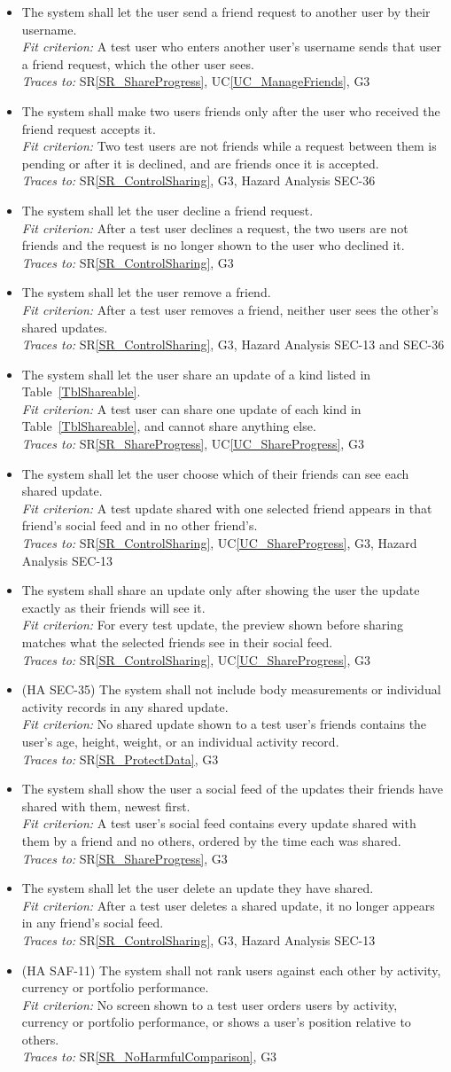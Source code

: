 \documentclass[12pt]{article}
\newcommand{\srref}[1]{SR\ref{#1}}
\newcommand{\ucref}[1]{UC\ref{#1}}
\newcounter{reqnum} %
\newcommand{\freq}[4]{%
  \item[FR\refstepcounter{reqnum}\thereqnum \label{#1}:] #2\\
  \textit{Fit criterion:} #3\\
  \textit{Traces to:} #4}
\begin{document}
\noindent \begin{itemize}
\freq{FR_SocialRequest}
  {The system shall let the user send a friend request to another user by
  their username.}
  {A test user who enters another user's username sends that user a friend
  request, which the other user sees.}
  {\srref{SR_ShareProgress}, \ucref{UC_ManageFriends}, G3}
\freq{FR_SocialAccept}
  {The system shall make two users friends only after the user who received
  the friend request accepts it.}
  {Two test users are not friends while a request between them is pending or
  after it is declined, and are friends once it is accepted.}
  {\srref{SR_ControlSharing}, G3, Hazard Analysis SEC-36}
\freq{FR_SocialDecline}
  {The system shall let the user decline a friend request.}
  {After a test user declines a request, the two users are not friends and the
  request is no longer shown to the user who declined it.}
  {\srref{SR_ControlSharing}, G3}
\freq{FR_SocialRemove}
  {The system shall let the user remove a friend.}
  {After a test user removes a friend, neither user sees the other's shared
  updates.}
  {\srref{SR_ControlSharing}, G3, Hazard Analysis SEC-13 and SEC-36}
\freq{FR_SocialShare}
  {The system shall let the user share an update of a kind listed in
  Table~\ref{TblShareable}.}
  {A test user can share one update of each kind in Table~\ref{TblShareable},
  and cannot share anything else.}
  {\srref{SR_ShareProgress}, \ucref{UC_ShareProgress}, G3}
\freq{FR_SocialChooseFriends}
  {The system shall let the user choose which of their friends can see each
  shared update.}
  {A test update shared with one selected friend appears in that friend's
  social feed and in no other friend's.}
  {\srref{SR_ControlSharing}, \ucref{UC_ShareProgress}, G3, Hazard Analysis
  SEC-13}
\freq{FR_SocialPreview}
  {The system shall share an update only after showing the user the update
  exactly as their friends will see it.}
  {For every test update, the preview shown before sharing matches what the
  selected friends see in their social feed.}
  {\srref{SR_ControlSharing}, \ucref{UC_ShareProgress}, G3}
\freq{FR_SocialNoBody}
  {(HA SEC-35) The system shall not include body measurements or individual
  activity records in any shared update.}
  {No shared update shown to a test user's friends contains the user's age,
  height, weight, or an individual activity record.}
  {\srref{SR_ProtectData}, G3}
\freq{FR_SocialFeed}
  {The system shall show the user a social feed of the updates their friends
  have shared with them, newest first.}
  {A test user's social feed contains every update shared with them by a friend
  and no others, ordered by the time each was shared.}
  {\srref{SR_ShareProgress}, G3}
\freq{FR_SocialDeleteUpdate}
  {The system shall let the user delete an update they have shared.}
  {After a test user deletes a shared update, it no longer appears in any
  friend's social feed.}
  {\srref{SR_ControlSharing}, G3, Hazard Analysis SEC-13}
\freq{FR_SocialNoRanking}
  {(HA SAF-11) The system shall not rank users against each other by activity,
  currency or portfolio performance.}
  {No screen shown to a test user orders users by activity, currency or
  portfolio performance, or shows a user's position relative to others.}
  {\srref{SR_NoHarmfulComparison}, G3}
\end{itemize}
\end{document}
